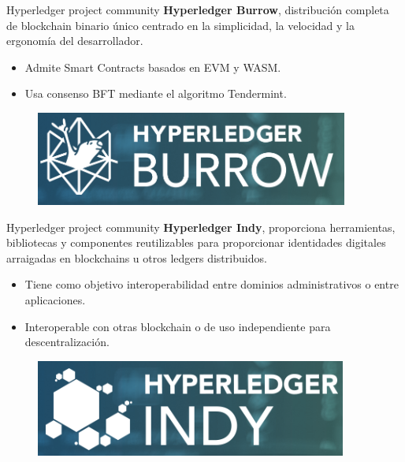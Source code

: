 \documentclass{beamer}
\begin{document}
	\begin{frame}
		\begin{block}{Hyperledger project community}
			\textbf{Hyperledger Burrow}, distribución completa de blockchain binario único centrado en la simplicidad, la velocidad y la ergonomía del desarrollador.
			\begin{itemize}
				\item Admite Smart Contracts basados en EVM y WASM.
				\item Usa consenso BFT mediante el algoritmo Tendermint.
			\end{itemize}
			\begin{figure}[h]
				\includegraphics[scale=.3]{burrow_logo}
				\centering
			\end{figure}
		\end{block}
	\end{frame}

	\begin{frame}
		\begin{block}{Hyperledger project community}
			\textbf{Hyperledger Indy}, proporciona herramientas, bibliotecas y componentes reutilizables para proporcionar identidades digitales arraigadas en blockchains u otros ledgers distribuidos.
			\begin{itemize}
				\item Tiene como objetivo interoperabilidad entre dominios administrativos o entre aplicaciones.
				\item Interoperable con otras blockchain o de uso independiente para descentralización.
			\end{itemize}
			\begin{figure}[h]
				\includegraphics[scale=.3]{indy_logo}
				\centering
			\end{figure}
		\end{block}
	\end{frame}
\end{document}
